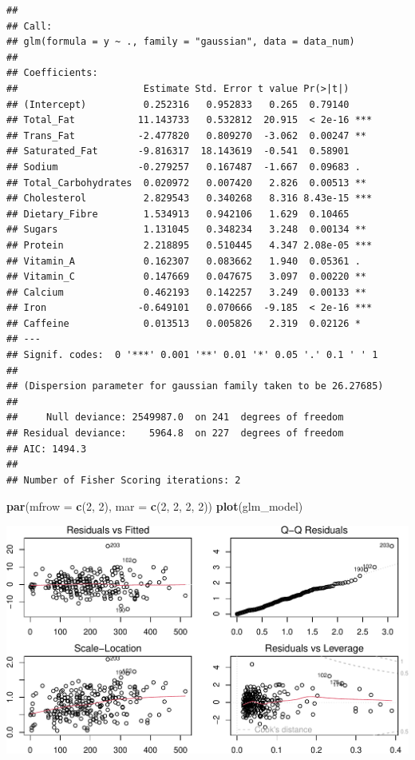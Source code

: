 \documentclass[
]{article}
\newenvironment{Shaded}{\begin{snugshade}}{\end{snugshade}}
\newcommand{\AttributeTok}[1]{\textcolor[rgb]{0.13,0.29,0.53}{#1}}
\newcommand{\DecValTok}[1]{\textcolor[rgb]{0.00,0.00,0.81}{#1}}
\newcommand{\FunctionTok}[1]{\textcolor[rgb]{0.13,0.29,0.53}{\textbf{#1}}}
\newcommand{\NormalTok}[1]{#1}
\begin{document}
\begin{verbatim}
## 
## Call:
## glm(formula = y ~ ., family = "gaussian", data = data_num)
## 
## Coefficients:
##                      Estimate Std. Error t value Pr(>|t|)    
## (Intercept)          0.252316   0.952833   0.265  0.79140    
## Total_Fat           11.143733   0.532812  20.915  < 2e-16 ***
## Trans_Fat           -2.477820   0.809270  -3.062  0.00247 ** 
## Saturated_Fat       -9.816317  18.143619  -0.541  0.58901    
## Sodium              -0.279257   0.167487  -1.667  0.09683 .  
## Total_Carbohydrates  0.020972   0.007420   2.826  0.00513 ** 
## Cholesterol          2.829543   0.340268   8.316 8.43e-15 ***
## Dietary_Fibre        1.534913   0.942106   1.629  0.10465    
## Sugars               1.131045   0.348234   3.248  0.00134 ** 
## Protein              2.218895   0.510445   4.347 2.08e-05 ***
## Vitamin_A            0.162307   0.083662   1.940  0.05361 .  
## Vitamin_C            0.147669   0.047675   3.097  0.00220 ** 
## Calcium              0.462193   0.142257   3.249  0.00133 ** 
## Iron                -0.649101   0.070666  -9.185  < 2e-16 ***
## Caffeine             0.013513   0.005826   2.319  0.02126 *  
## ---
## Signif. codes:  0 '***' 0.001 '**' 0.01 '*' 0.05 '.' 0.1 ' ' 1
## 
## (Dispersion parameter for gaussian family taken to be 26.27685)
## 
##     Null deviance: 2549987.0  on 241  degrees of freedom
## Residual deviance:    5964.8  on 227  degrees of freedom
## AIC: 1494.3
## 
## Number of Fisher Scoring iterations: 2
\end{verbatim}

\begin{Shaded}
\begin{Highlighting}[]
\FunctionTok{par}\NormalTok{(}\AttributeTok{mfrow =} \FunctionTok{c}\NormalTok{(}\DecValTok{2}\NormalTok{, }\DecValTok{2}\NormalTok{), }\AttributeTok{mar =} \FunctionTok{c}\NormalTok{(}\DecValTok{2}\NormalTok{, }\DecValTok{2}\NormalTok{, }\DecValTok{2}\NormalTok{, }\DecValTok{2}\NormalTok{))}
\FunctionTok{plot}\NormalTok{(glm\_model)}
\end{Highlighting}
\end{Shaded}

\begin{center}\includegraphics{Statistical_Learning_Final_Report_files/figure-latex/logistic_regression-1} \end{center}
\end{document}
